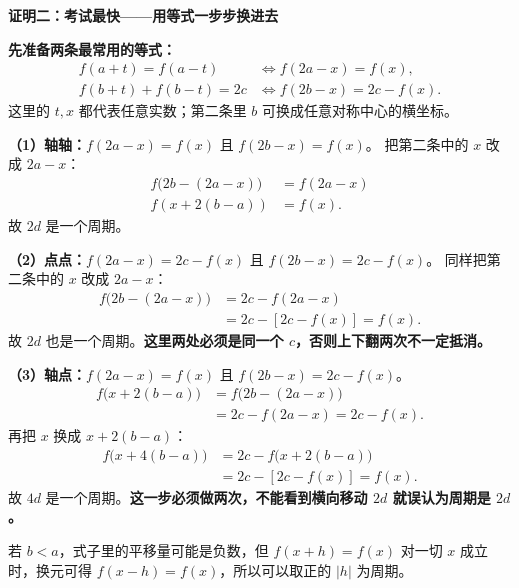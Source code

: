 \begin{proofbox}
\textbf{\textcolor{CProof}{证明二：考试最快——用等式一步步换进去}}



\textbf{先准备两条最常用的等式：}
\[
\begin{aligned}
  f(a+t)=f(a-t)&\iff f(2a-x)=f(x),\\
  f(b+t)+f(b-t)=2c&\iff f(2b-x)=2c-f(x).
\end{aligned}
\]
这里的 $t,x$ 都代表任意实数；第二条里 $b$ 可换成任意对称中心的横坐标。

\textbf{（1）轴轴：}\quad$f(2a-x)=f(x)$ 且 $f(2b-x)=f(x)$。
把第二条中的 $x$ 改成 $2a-x$：
\[
\begin{aligned}
 f\bigl(2b-(2a-x)\bigr)&=f(2a-x)\\
 f(x+2(b-a))&=f(x).
\end{aligned}
\]
故 $2d$ 是一个周期。

\textbf{（2）点点：}\quad$f(2a-x)=2c-f(x)$ 且 $f(2b-x)=2c-f(x)$。
同样把第二条中的 $x$ 改成 $2a-x$：
\[
\begin{aligned}
 f\bigl(2b-(2a-x)\bigr)
   &=2c-f(2a-x)\\
   &=2c-[2c-f(x)]=f(x).
\end{aligned}
\]
故 $2d$ 也是一个周期。\textbf{这里两处必须是同一个 $c$，否则上下翻两次不一定抵消。}

\textbf{（3）轴点：}\quad$f(2a-x)=f(x)$ 且 $f(2b-x)=2c-f(x)$。
\[
\begin{aligned}
 f\bigl(x+2(b-a)\bigr)
  &=f\bigl(2b-(2a-x)\bigr)\\
  &=2c-f(2a-x)=2c-f(x).
\end{aligned}
\]
再把 $x$ 换成 $x+2(b-a)$：
\[
\begin{aligned}
 f\bigl(x+4(b-a)\bigr)
 &=2c-f\bigl(x+2(b-a)\bigr)\\
 &=2c-[2c-f(x)]=f(x).
\end{aligned}
\]
故 $4d$ 是一个周期。\textbf{这一步必须做两次，不能看到横向移动 $2d$ 就误认为周期是 $2d$。}

若 $b<a$，式子里的平移量可能是负数，但 $f(x+h)=f(x)$ 对一切 $x$ 成立时，换元可得 $f(x-h)=f(x)$，所以可以取正的 $|h|$ 为周期。

\medskip

\end{proofbox}
\clearpage

